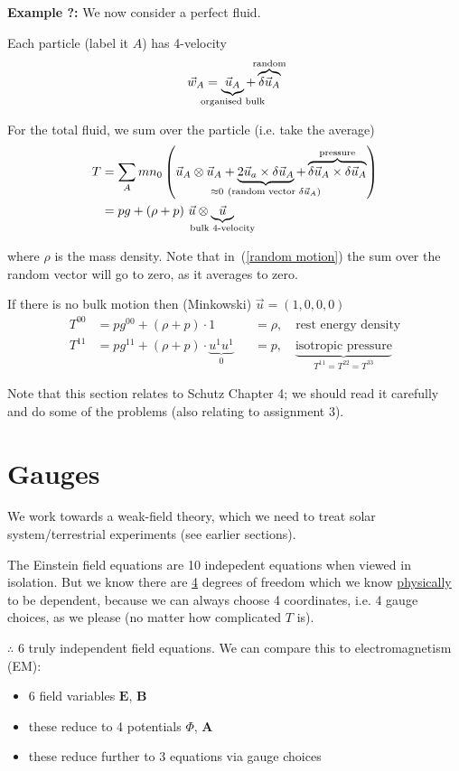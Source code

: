 \documentclass[a4paper]{article} %
\newcommand{\vect}[1]{\mathbf{#1}} %
\newcommand{\example}[2]
{
\begin{framed}
\textbf{Example #1:} #2
\end{framed}
}
\begin{document}
\example{?}{
We now consider a perfect fluid.

Each particle (label it $A$) has 4-velocity
\begin{equation}
\vec{w}_A=\underbrace{\vec{u}_A}_{\mathclap{\text{organised bulk}}}
+\overbrace{\delta \vec{u}_A}^{\mathclap{\text{random}}}
\end{equation}

For the total fluid, we sum over the particle (i.e. take the average)
\begin{align}
T&=\sum_A m n_0 \left(\vec{u}_A \otimes \vec{u}_A 
+ \underbrace{2\vec{u}_a \times \delta \vec{u}_A}_{\mathclap{\approx0~\text{(random vector $\delta\vec{u}_A$)}}}
+ \overbrace{\delta \vec{u}_A \times \delta \vec{u}_A}^{\text{pressure}}\right) \label{random motion} \\
&= p g + (\rho + p)~\vec{u} \otimes \underbrace{\vec{u}}_{\mathclap{\text{bulk 4-velocity}}}
\end{align}


where $\rho$ is the mass density. Note that in~(\ref{random motion}) the sum over the random vector will go to zero, as it averages to zero.

If there is no bulk motion then (Minkowski) $\vec{u}=(1,0,0,0)$
\begin{align}
T^{00}&=p g^{00}+(\rho+p)\cdot 1 &&= \rho,\quad\text{rest energy density}\\
T^{11}&=pg^{11}+(\rho+p)\cdot \underbrace{u^{1} u^{1}}_{0} &&=p,
\quad\underbrace{\text{isotropic pressure}}_{T^{11}=T^{22}=T^{33}}
\end{align}

Note that this section relates to Schutz Chapter 4; we should read it carefully and do some of the problems (also relating to assignment 3).
}

\section{Gauges}


We work towards a weak-field theory, which we need to treat solar system/terrestrial experiments (see earlier sections).

The Einstein field equations are 10 indepedent equations when viewed in isolation. But we know there are \underline{4} degrees of freedom which we know \underline{physically} to be dependent, because we can always choose 4 coordinates, i.e. 4 gauge choices, as we please (no matter how complicated $T$ is).

$\therefore$ 6 truly independent field equations. We can compare this to electromagnetism (EM):
\begin{itemize}
\item 6 field variables $\vect{E}$, $\vect{B}$
\item these reduce to 4 potentials $\Phi$, $\vect{A}$
\item these reduce further to 3 equations via gauge choices
\end{itemize}
\end{document}
